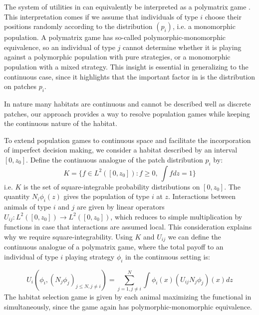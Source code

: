 

The system of utilities in  can equivalently be interpreted as a polymatrix game \citep{howson1972equilibria}. This interpretation comes if we assume that individuals of type $i$ choose their positions randomly according to the distribution $(p_i)$, i.e. a monomorphic population. A polymatrix game has so-called polymorphic-monomorphic equivalence, so an individual of type $j$ cannot determine whether it is playing against a polymorphic population with pure strategies, or a monomorphic population with a mixed strategy. This insight is essential in generalizing to the continuous case, since it highlights that the important factor in  is the distribution on patches $p_i$.

In nature many habitats are continuous and cannot be described well as discrete patches, our approach provides a way to resolve population games while keeping the continuous nature of the habitat.

To extend population games to continuous space and facilitate the incorporation of imperfect decision making, we consider a habitat described by an interval $[0,z_0]$. Define the continuous analogue of the patch distribution $p_i$ by:
\begin{equation}
  K = \{ f \in L^2([0,z_0]) : f \geq 0,~\int f dz = 1\}
  \label{eq:space_of_dists}
\end{equation}
i.e. $K$ is the set of square-integrable probability distributions on $[0,z_0]$. The quantity $N_i \phi_i(z)$ gives the population of type $i$ at $z$. Interactions between animals of type $i$ and $j$ are given by linear operators $U_{ij}: L^2([0,z_0]) \to L^2([0,z_0])$, which reduces to simple multiplication by functions in case that interactions are assumed local. This consideration explains why we require square-integrability. Using $K$ and $U_{ij}$ we can define the continuous analogue of a polymatrix game, where the total payoff to an individual of type $i$ playing strategy $\phi_i$ in the continuous setting is:

\begin{equation}
  U_i(\phi_i, (N_j \phi_j)_{j \leq N, j \neq i}) = \sum_{j=1,j\neq i}^N \int \phi_i(x) (U_{ij}N_j \phi_j)(x) dz%
  \label{eq:utility}
\end{equation}
The habitat selection game is given by each animal maximizing the functional in  simultaneously, since the game again has polymorphic-monomorphic equivalence.

